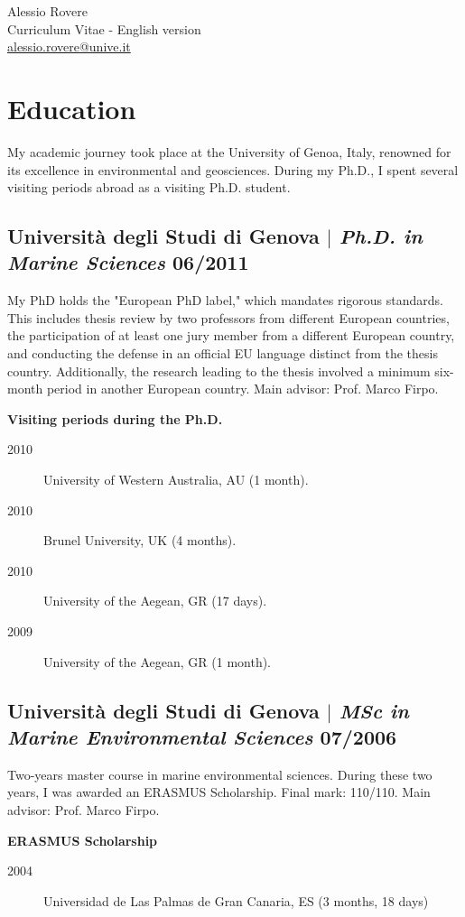 \documentclass[11pt]{article}
\begin{document}
\begin{center}
    {\fontsize{36}{36}\selectfont\interthin Alessio \interheavy Rovere} \\ \bigskip
    {\fontsize{14}{14}\selectfont\interthin Curriculum Vitae - English version}\\ \bigskip
    {\color{icnclr}\faEnvelope[regular]} \href{mailto:alessio.rovere@unive.it}{alessio.rovere@unive.it}
\end{center}

\section{Education}
{\normalfont My academic journey took place at the University of Genoa, Italy, renowned for its excellence in environmental and geosciences. During my Ph.D., I spent several visiting periods abroad as a visiting Ph.D. student.} \\

\bigskip
\subsection{Università degli Studi di Genova $|$ {\normalfont\textit{Ph.D. in Marine Sciences}} \hfill 06/2011}
{\footnotesize My PhD holds the "European PhD label," which mandates rigorous standards. This includes thesis review by two professors from different European countries, the participation of at least one jury member from a different European country, and conducting the defense in an official EU language distinct from the thesis country. Additionally, the research leading to the thesis involved a minimum six-month period in another European country. Main advisor: Prof. Marco Firpo.}\\
{\footnotesize 
\textbf{Visiting periods during the Ph.D.}
\begin{description}
  \item [2010] University of Western Australia, AU (1 month).
  \item [2010] Brunel University, UK (4 months).
  \item [2010] University of the Aegean, GR (17 days).
  \item [2009] University of the Aegean, GR (1 month).
\end{description}}
\bigskip

\subsection{Università degli Studi di Genova $|$ {\normalfont\textit{MSc in Marine Environmental Sciences}} \hfill 07/2006}
{\footnotesize Two-years master course in marine environmental sciences. During these two years, I was awarded an ERASMUS Scholarship. Final mark: 110/110. Main advisor: Prof. Marco Firpo.}\\
{\footnotesize 
\textbf{ERASMUS Scholarship}
\begin{description}
  \item [2004] Universidad de Las Palmas de Gran Canaria, ES (3 months, 18 days)
\end{description}
\bigskip}
\end{document}
